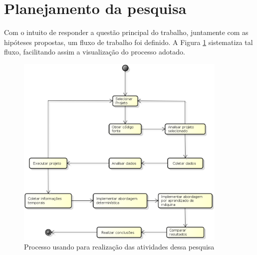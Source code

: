 \section{Planejamento da pesquisa}

Com o intuito de responder a questão principal do trabalho, juntamente com as
hipóteses propostas, um fluxo de trabalho foi definido. A Figura
\ref{fig:planejamento_pesquisa} sistematiza tal fluxo, facilitando assim a visualização do processo adotado.

\begin{figure}[h]
  \centering
  \includegraphics[width=0.9\textwidth]{figuras/planejamento_pesquisa.eps}
  \caption{Processo usando para realização das atividades dessa pesquisa}
  \label{fig:planejamento_pesquisa}
\end{figure}

